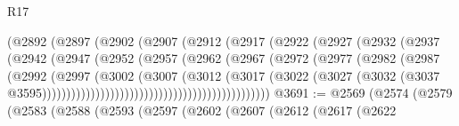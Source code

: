 \begin{lexlean}{R17}
\begin{coremodule}
{{{{{{{{{{{{{{{{{{{{{{{{{{{{{{{{{{{{{{{{{{{{{{{{{{{{{{{{{{{{{{{{{{{{{{{{{{{{{{{{{{{{{{{{{{{{{{{{{{{{{{{{{{{                                      (@2892
                                        (@2897
                                          (@2902
                                            (@2907
                                              (@2912
                                                (@2917
                                                  (@2922
                                                    (@2927
                                                      (@2932
                                                        (@2937
                                                          (@2942
                                                            (@2947
                                                              (@2952
                                                                (@2957
                                                                  (@2962
                                                                    (@2967
                                                                      (@2972
                                                                        (@2977
                                                                          (@2982
                                                                            (@2987
                                                                              (@2992
                                                                                (@2997
                                                                                  (@3002
                                                                                    (@3007
                                                                                      (@3012
                                                                                        (@3017
                                                                                          (@3022
                                                                                            (@3027
                                                                                              (@3032
                                                                                                (@3037
                                                                                                  @3595)))))))))))))))))))))))))))))))))))))))))))))))
@3691 := @2569
    (@2574
      (@2579
        (@2583
          (@2588
            (@2593
              (@2597
                (@2602
                  (@2607
                    (@2612
                      (@2617
                        (@2622
}}}}}}}}}}}}}}}}}}}}}}}}}}}}}}}}}}}}}}}}}}}}}}}}}}}}}}}}}}}}}}}}}}}}}}}}}}}}}}}}}}}}}}}}}}}}}}}}}}}}}}}}}}}
\end{coremodule}
\end{lexlean}
